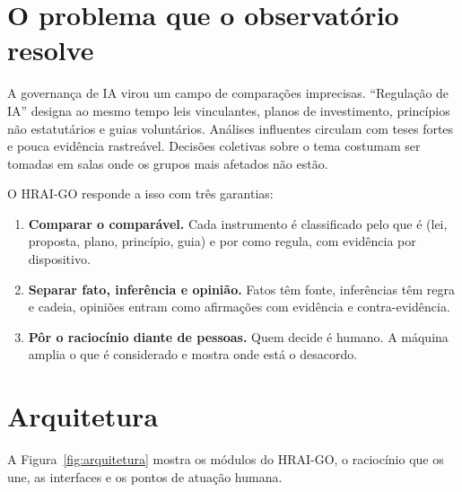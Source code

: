 \documentclass[12pt,a4paper,oneside,english,brazil]{abntex2}
\begin{document}
\chapter{O problema que o observatório resolve}

A governança de IA virou um campo de comparações imprecisas. ``Regulação de IA'' designa ao mesmo tempo leis vinculantes, planos de investimento, princípios não estatutários e guias voluntários. Análises influentes circulam com teses fortes e pouca evidência rastreável. Decisões coletivas sobre o tema costumam ser tomadas em salas onde os grupos mais afetados não estão.

O HRAI-GO responde a isso com três garantias:
\begin{enumerate}[leftmargin=*]
  \item \textbf{Comparar o comparável.} Cada instrumento é classificado pelo que é (lei, proposta, plano, princípio, guia) e por como regula, com evidência por dispositivo.
  \item \textbf{Separar fato, inferência e opinião.} Fatos têm fonte, inferências têm regra e cadeia, opiniões entram como afirmações com evidência e contra-evidência.
  \item \textbf{Pôr o raciocínio diante de pessoas.} Quem decide é humano. A máquina amplia o que é considerado e mostra onde está o desacordo.
\end{enumerate}

\chapter{Arquitetura}

A Figura~\ref{fig:arquitetura} mostra os módulos do HRAI-GO, o raciocínio que os une, as interfaces e os pontos de atuação humana.
\end{document}
